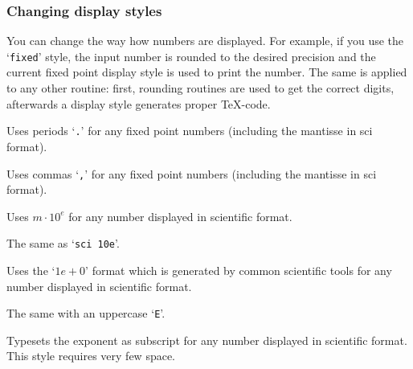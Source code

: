 \subsubsection{Changing display styles}%
\label{sec:number:styles}%
You can change the way how numbers are displayed. For example, if you use the `\texttt{fixed}' style, the input number is rounded to the desired precision and the current fixed point display style is used to print the number. The same is applied to any other routine: first, rounding routines are used to get the correct digits, afterwards a display style generates proper \TeX-code.

\begin{description}
\def\examplenumbers{12.346}%
\item[\texttt{use period}] Uses periods `\texttt{.}' for any fixed point numbers (including the mantisse in sci format).


\item[\texttt{use comma}] Uses commas `\texttt{,}' for any fixed point numbers (including the mantisse in sci format).



\item[\texttt{sci 10e}] Uses $m \cdot 10^e$ for any number displayed in scientific format.


\item[\texttt{sci 10\textasciicircum e}] The same as `\texttt{sci 10e}'.

\item[\texttt{sci e}] Uses the `$1e{+}0$' format which is generated by common scientific tools for any number displayed in scientific format.


\item[\texttt{sci E}] The same with an uppercase `\texttt{E}'.


\item[\texttt{sci subscript}] Typesets the exponent as subscript for any number displayed in scientific format. This style requires very few space.

\end{description}

